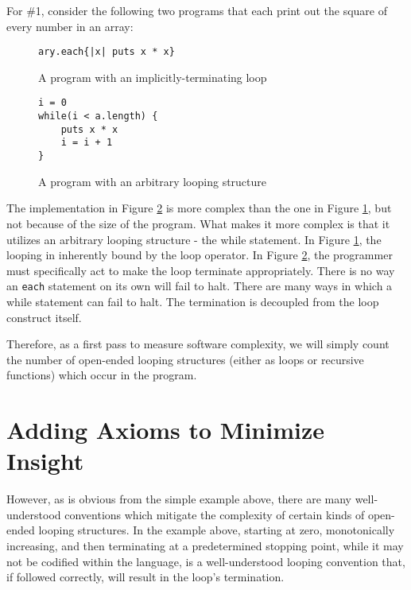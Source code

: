 For \#1, consider the following two programs that each print out the square of every number in an array:

\begin{figure}[H]
\begin{verbatim}
ary.each{|x| puts x * x}
\end{verbatim}
\caption{A program with an implicitly-terminating loop}
\label{fig:impterm}
\end{figure}

\begin{figure}[H]
\begin{verbatim}
i = 0
while(i < a.length) {
	puts x * x
	i = i + 1
}
\end{verbatim}
\caption{A program with an arbitrary looping structure}
\label{fig:expterm}
\end{figure}

The implementation in Figure \ref{fig:expterm} is more complex than the one in Figure \ref{fig:impterm}, but not because of the size of the program.  What makes it more complex is that it utilizes an arbitrary looping structure - the while statement.  In Figure \ref{fig:impterm}, the looping in inherently bound by the loop operator.  In Figure \ref{fig:expterm}, the programmer must specifically act to make the loop terminate appropriately.  There is no way an \verb+each+ statement on its own will fail to halt.  There are many ways in which a while statement can fail to halt.  The termination is decoupled from the loop construct itself.

Therefore, as a first pass to measure software complexity, we will simply count the number of open-ended looping structures (either as loops or recursive functions) which occur in the program.   

\section{Adding Axioms to Minimize Insight}

However, as is obvious from the simple example above, there are many well-understood conventions which mitigate the complexity of certain kinds of open-ended looping structures.  In the example above, starting at zero, monotonically increasing, and then terminating at a predetermined stopping point, while it may not be codified within the language, is a well-understood looping convention that, if followed correctly, will result in the loop's termination.


